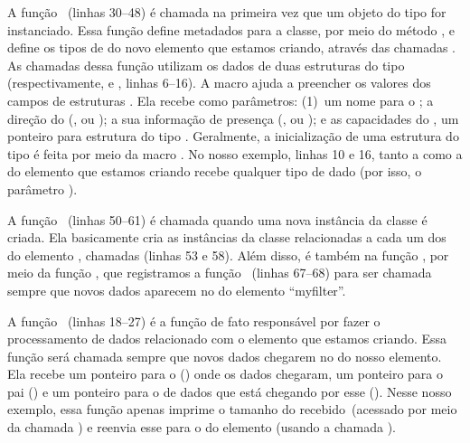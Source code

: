 A função ~(linhas 30--48) é chamada na primeira vez
que um objeto do tipo  for instanciado.  Essa função define
metadados para a classe, por meio do método ,
e define os tipos de  do novo elemento que estamos criando, através
das chamadas .  As chamadas dessa função
utilizam os dados de duas estruturas do tipo 
(respectivamente,  e , linhas 6--16).  A macro
 ajuda a preencher os valores dos campos de
estruturas .  Ela recebe como parâmetros: (1)~um nome
para o ; a direção do  (,
 ou ); a sua informação de presença
(,  ou ); e as
capacidades do , um ponteiro para estrutura do tipo .
Geralmente, a inicialização de uma estrutura do tipo  é feita por
meio da macro .  No nosso exemplo, linhas 10 e 16, tanto a
 como a  do elemento que estamos criando recebe
qualquer tipo de dado (por isso, o parâmetro ).

\begin{sloppypar}
A função ~(linhas 50--61) é chamada quando uma nova
instância da classe  é criada.  Ela basicamente cria as
instâncias da classe  relacionadas a cada um dos  do
elemento , chamadas  (linhas
53 e 58).  Além disso, é também na função , por meio da
função , que registramos a função
~(linhas 67--68)  para ser chamada sempre que novos
dados aparecem no  do elemento ``myfilter''.
\end{sloppypar}

A função ~(linhas 18--27) é a função de fato responsável
por fazer o processamento de dados relacionado com o elemento que estamos
criando.  Essa função será chamada sempre que novos dados chegarem no
 do nosso elemento.  Ela recebe um ponteiro para o 
() onde os dados chegaram, um ponteiro para o pai () e
um ponteiro para o  de dados que está chegando por esse 
().  Nesse nosso exemplo, essa função apenas imprime o tamanho
do  recebido~(acessado por meio da chamada
) e reenvia esse  para o  do
elemento (usando a chamada ).


